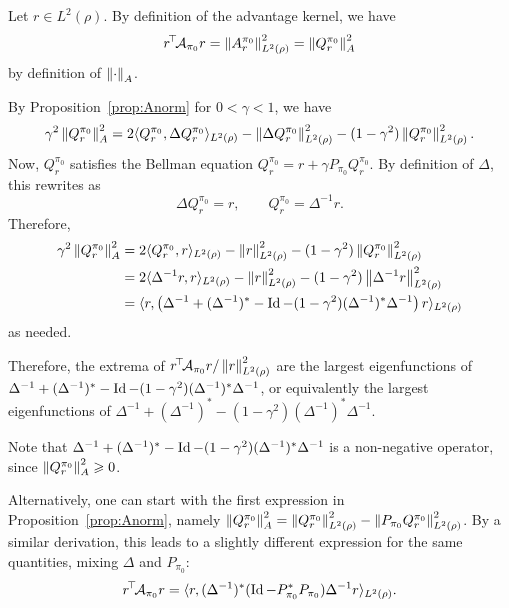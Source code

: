 \documentclass[11pt,a4paper]{article}
\newcommand{\AK}{\mathcal{A}}
\begin{document}
\begin{dem}
Let $r\in L^2(\rho)$. By definition of the
advantage kernel, we have
\begin{equation}
\transp{r}
\AK_{\pi_0}r=\norm{A^{\pi_0}_r}^2_{L^2(\rho)}=\norm{Q^{\pi_0}_r}^2_A
\end{equation}
by definition of $\left\lVert\cdot\right\rVert_A$.

By Proposition~\ref{prop:Anorm} for $0<\gamma<1$, we have
\begin{equation}
\gamma^2 \left\lVert Q^{\pi_0}_r\right\rVert^2_A=2\langle Q^{\pi_0}_r,\Delta Q^{\pi_0}_r
\rangle_{L^2(\rho)}-\left\lVert\Delta Q^{\pi_0}_r\right\rVert^2_{L^2(\rho)}-(1-\gamma^2)
\left\lVert Q^{\pi_0}_r\right\rVert^2_{L^2(\rho)}.
\end{equation}
Now, $Q^{\pi_0}_r$ satisfies the Bellman equation
$Q^{\pi_0}_r=r+\gamma P_{\pi_0} Q^{\pi_0}_r$. By definition of
$\Delta$, this rewrites as
\begin{equation}
\Delta Q^{\pi_0}_r=r, \qquad Q^{\pi_0}_r=\Delta^{-1}r.
\end{equation}
Therefore,
\begin{align*}
\gamma^2 \left\lVert Q^{\pi_0}_r\right\rVert^2_A
&=2 \langle
Q^{\pi_0}_r,r\rangle_{L^2(\rho)}-\left\lVert r\right\rVert^2_{L^2(\rho)}-(1-\gamma^2)\left\lVert Q^{\pi_0}_r\right\rVert^2_{L^2(\rho)}
\\&=2\langle \Delta^{-1}
r,r\rangle_{L^2(\rho)}-\left\lVert r\right\rVert^2_{L^2(\rho)}-(1-\gamma^2)\left\lVert\Delta^{-1}r\right\rVert^2_{L^2(\rho)}
\\&=\langle r, \left(\Delta^{-1}+(\Delta^{-1})^{\ast}-\operatorname{Id}-(1-\gamma^2)
(\Delta^{-1})^\ast \Delta^{-1}\right)r\rangle_{L^2(\rho)}
\end{align*}
as needed.

Therefore, the extrema of
$\transp{r}\AK_{\pi_0}r/\norm{r}^2_{L^2(\rho)}$ are the largest
eigenfunctions of $\Delta^{-1}+(\Delta^{-1})^{\ast}-\operatorname{Id}-(1-\gamma^2)
(\Delta^{-1})^\ast \Delta^{-1}$, or equivalently
the
largest eigenfunctions of $\Delta^{-1}+(\Delta^{-1})^{\ast}-(1-\gamma^2)
(\Delta^{-1})^\ast \Delta^{-1}$.

Note that $\Delta^{-1}+(\Delta^{-1})^{\ast}-\operatorname{Id}-(1-\gamma^2)
(\Delta^{-1})^\ast \Delta^{-1}$ is a non-negative operator, since
$\left\lVert Q^{\pi_0}_r\right\rVert^2_A\geqslant 0$.

\bigskip

Alternatively, one can start with the first expression in
Proposition~\ref{prop:Anorm}, namely $\left\lVert Q^{\pi_0}_r\right\rVert^2_A=\left\lVert Q^{\pi_0}_r\right\rVert^2_{L^2(\rho)}-
\left\lVert P_{\pi_0} Q^{\pi_0}_r\right\rVert^2_{L^2(\rho)}$. By a similar derivation,
this leads to a slightly different expression for the same quantities,
mixing $\Delta$ and $P_{\pi_0}$:
\begin{equation}
\transp{r}\AK_{\pi_0}r=
\langle r, (\Delta^{-1})^\ast (\Id-P_{\pi_0}^\ast
P_{\pi_0})\Delta^{-1} r\rangle_{L^2(\rho)}.
\end{equation}
\end{dem}
\end{document}
